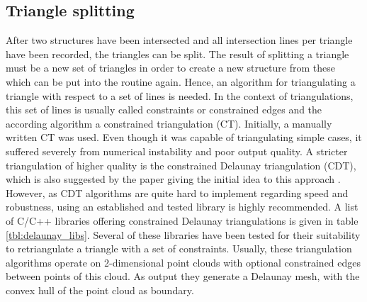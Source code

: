 \subsection{Triangle splitting}
\label{sec:triangle_splitting}

After two structures have been intersected and all intersection lines per triangle have been recorded, the triangles can be split.
The result of splitting a triangle must be a new set of triangles in order to create a new structure from these which can be put into the  routine again.
Hence, an algorithm for triangulating a triangle with respect to a set of lines is needed.
In the context of triangulations, this set of lines is usually called constraints or constrained edges and the according algorithm a constrained triangulation (CT).
Initially, a manually written CT was used.
Even though it was capable of triangulating simple cases, it suffered severely from numerical instability and poor output quality.
A stricter triangulation of higher quality is the constrained Delaunay triangulation (CDT), which is also suggested by the paper giving the initial idea to this approach \cite{mesh_intersection}.
However, as CDT algorithms are quite hard to implement regarding speed and robustness, using an established and tested library is highly recommended.
A list of C/C++ libraries offering constrained Delaunay triangulations is given in table \ref{tbl:delaunay_libs}.
Several of these libraries have been tested for their suitability to retriangulate a triangle with a set of constraints.
Usually, these triangulation algorithms operate on 2-dimensional point clouds with optional constrained edges between points of this cloud.
As output they generate a Delaunay mesh, with the convex hull of the point cloud as boundary.

